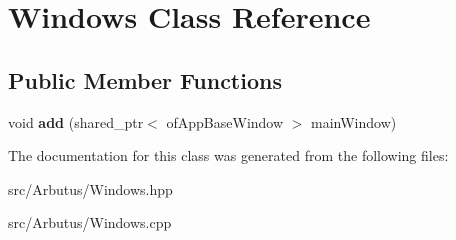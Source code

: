 \hypertarget{class_windows}{}\section{Windows Class Reference}
\label{class_windows}
\subsection*{Public Member Functions}
\begin{DoxyCompactItemize}
\item 
\mbox{\label{class_windows_a038f74c39cb3fdaa40fb10d5095bdb92}} 
void {\bfseries add} (shared\+\_\+ptr$<$ of\+App\+Base\+Window $>$ main\+Window)
\end{DoxyCompactItemize}


The documentation for this class was generated from the following files\+:\begin{DoxyCompactItemize}
\item 
src/\+Arbutus/Windows.\+hpp\item 
src/\+Arbutus/Windows.\+cpp\end{DoxyCompactItemize}
